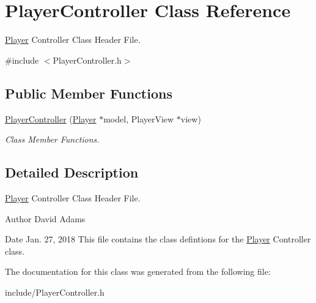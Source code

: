 \hypertarget{classPlayerController}{\section{Player\-Controller Class Reference}
\label{classPlayerController}
}


\hyperlink{classPlayer}{Player} Controller Class Header File.  




{\ttfamily \#include $<$Player\-Controller.\-h$>$}

\subsection*{Public Member Functions}
\begin{DoxyCompactItemize}
\item 
\hypertarget{classPlayerController_a873eaf9c396b3ceee79395239f1164bf}{\hyperlink{classPlayerController_a873eaf9c396b3ceee79395239f1164bf}{Player\-Controller} (\hyperlink{classPlayer}{Player} $\ast$model, Player\-View $\ast$view)}\label{classPlayerController_a873eaf9c396b3ceee79395239f1164bf}

\begin{DoxyCompactList}\small\item\em Class Member Functions. \end{DoxyCompactList}\end{DoxyCompactItemize}


\subsection{Detailed Description}
\hyperlink{classPlayer}{Player} Controller Class Header File. 

\begin{DoxyAuthor}{Author}
David Adams 
\end{DoxyAuthor}
\begin{DoxyDate}{Date}
Jan. 27, 2018 This file contains the class defintions for the \hyperlink{classPlayer}{Player} Controller class. 
\end{DoxyDate}


The documentation for this class was generated from the following file\-:\begin{DoxyCompactItemize}
\item 
include/Player\-Controller.\-h\end{DoxyCompactItemize}
